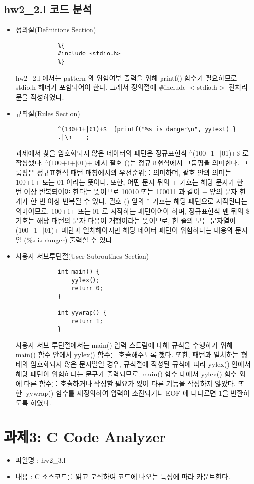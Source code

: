 \documentclass{article}
\begin{document}
\subsection{hw2\_2.l 코드 분석}
\begin{itemize}
	\item 정의절(Definitions Section)	
		\begin{lstlisting}
			%{
			#include <stdio.h>
			%}
		\end{lstlisting}
		hw2\_2.l 에서는 pattern 의 위험여부 출력을 위해 printf() 함수가 필요하므로 stdio.h
		헤더가 포함되어야 한다. 그래서 정의절에 \#include $<$stdio.h$>$ 전처리문을 작성하였다.
	\item 규칙절(Rules Section)	
		\begin{lstlisting}
			^(100+1+|01)+$	{printf("%s is danger\n", yytext);}
			.|\n	;
		\end{lstlisting}
		과제에서 찾을 암호화되지 않은 데이터의 패턴은 정규표현식 $ ^\wedge $(100+1+$|$01)+\$
		로 작성했다. $ ^\wedge $(100+1+$|$01)+ 에서 괄호 ()는 정규표현식에서 그룹핑을 의미한다.
		그룹핑은 정규표현식 패턴 매칭에서의 우선순위를 의미하며, 괄호 안의 의미는 100+1+ 또는 01 이라는 뜻이다.
		또한, 어떤 문자 뒤의 + 기호는 해당 문자가 한 번 이상 반복되어야 한다는 뜻이므로 10010
		또는 100011 과 같이 + 앞의 문자 한 개가 한 번 이상 반복될 수 있다. 괄호 () 앞의 $ ^\wedge $
		기호는 해당 패턴으로 시작된다는 의미이므로, 100+1+ 또는 01 로 시작하는 패턴이어야 하며,
		정규표현식 맨 뒤의 \$ 기호는 해당 패턴의 문자 다음이 개행이라는 뜻이므로, 한 줄의 모든
		문자열이 (100+1+$|$01)+ 패턴과 일치해야지만 해당 데이터 패턴이 위험하다는 내용의 문자열
		(\%s is danger) 출력할 수 있다.
	\item 사용자 서브루틴절(User Subroutines Section)	
		\begin{lstlisting}
			int main() {
				yylex();
				return 0;
			}
			
			int yywrap() {
				return 1;
			}
		\end{lstlisting}
		사용자 서브 루틴절에서는 main() 입력 스트림에 대해 규칙을 수행하기 위해 
		main() 함수 안에서 yylex() 함수를 호출해주도록 했다. 또한, 패턴과
		일치하는 형태의 암호화되지 않은 문자열일 경우, 규칙절에 작성된 규칙에 따라
		yylex() 안에서 해당 패턴이 위험하다는 문구가 출력되므로, main() 함수
		내에서 yylex() 함수 외에 다른 함수를 호출하거나 작성할 필요가 없어
		다른 기능을 작성하지 않았다. 또한, yywrap() 함수를 재정의하여 입력이
		소진되거나 EOF 에 다다르면 1을 반환하도록 하였다.
\end{itemize}

\section{과제3: C Code Analyzer}
\begin{itemize}
	\item 파일명 : hw2\_3.l
	\item 내용 : C 소스코드를 읽고 분석하여 코드에 나오는 특성에 따라 카운트한다.
\end{itemize}
\end{document}
